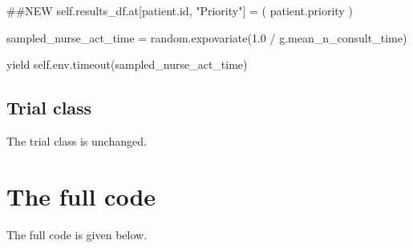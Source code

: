 \documentclass[
  letterpaper,
  DIV=11,
  numbers=noendperiod]{scrreprt}
\newenvironment{Shaded}{}{}
\newcommand{\BuiltInTok}[1]{\textcolor[rgb]{0.84,0.23,0.29}{#1}}
\newcommand{\CommentTok}[1]{\textcolor[rgb]{0.42,0.45,0.49}{#1}}
\newcommand{\ControlFlowTok}[1]{\textcolor[rgb]{0.84,0.23,0.29}{#1}}
\newcommand{\FloatTok}[1]{\textcolor[rgb]{0.00,0.36,0.77}{#1}}
\newcommand{\NormalTok}[1]{\textcolor[rgb]{0.14,0.16,0.18}{#1}}
\newcommand{\OperatorTok}[1]{\textcolor[rgb]{0.14,0.16,0.18}{#1}}
\newcommand{\StringTok}[1]{\textcolor[rgb]{0.01,0.18,0.38}{#1}}
\newcommand{\VariableTok}[1]{\textcolor[rgb]{0.89,0.38,0.04}{#1}}
\begin{document}
\begin{Shaded}
\begin{Highlighting}[]
                \CommentTok{\#\#NEW}
                \VariableTok{self}\NormalTok{.results\_df.at[patient.}\BuiltInTok{id}\NormalTok{, }\StringTok{"Priority"}\NormalTok{] }\OperatorTok{=}\NormalTok{ (}
\NormalTok{                    patient.priority}
\NormalTok{                )}

\NormalTok{            sampled\_nurse\_act\_time }\OperatorTok{=}\NormalTok{ random.expovariate(}\FloatTok{1.0} \OperatorTok{/}
\NormalTok{                                                        g.mean\_n\_consult\_time)}

            \ControlFlowTok{yield} \VariableTok{self}\NormalTok{.env.timeout(sampled\_nurse\_act\_time)}
\end{Highlighting}
\end{Shaded}

\subsection{Trial class}\label{trial-class-2}

The trial class is unchanged.

\section{The full code}\label{the-full-code}

The full code is given below.
\end{document}
